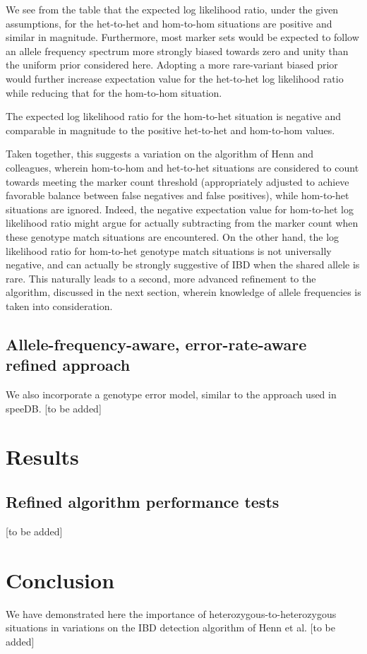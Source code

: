 \documentclass{article}
\begin{document}
We see from the table that the expected log likelihood ratio, under the given assumptions, for the het-to-het and hom-to-hom situations are positive and similar in magnitude. Furthermore, most marker sets would be expected to follow an allele frequency spectrum more strongly biased towards zero and unity than the uniform prior considered here. Adopting a more rare-variant biased prior would further increase expectation value for the het-to-het log likelihood ratio while reducing that for the hom-to-hom situation.

The expected log likelihood ratio for the hom-to-het situation is negative and comparable in magnitude to the positive het-to-het and hom-to-hom values.

Taken together, this suggests a variation on the algorithm of Henn and colleagues, wherein hom-to-hom and het-to-het situations are considered to count towards meeting the marker count threshold (appropriately adjusted to achieve favorable balance between false negatives and false positives), while hom-to-het situations are ignored. Indeed, the negative expectation value for hom-to-het log likelihood ratio might argue for actually subtracting from the marker count when these genotype match situations are encountered. On the other hand, the log likelihood ratio for hom-to-het genotype match situations is not universally negative, and can actually be strongly suggestive of IBD when the shared allele is rare. This naturally leads to a second, more advanced refinement to the algorithm, discussed in the next section, wherein knowledge of allele frequencies is taken into consideration.

\subsection{Allele-frequency-aware, error-rate-aware refined approach}
We also incorporate a genotype error model, similar to the approach used in speeDB.\citep{speeDB}
[to be added]

\section{Results}
\subsection{Refined algorithm performance tests}
[to be added]

\section{Conclusion}
We have demonstrated here the importance of heterozygous-to-heterozygous situations in variations on the IBD detection algorithm of Henn et al. [to be added] 
\end{document}
